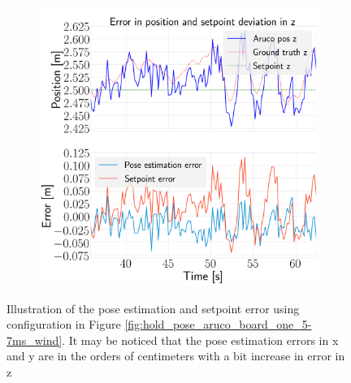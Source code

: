 \documentclass[../Head/report.tex]{subfiles}
\begin{document}
\begin{figure}[H]
\begin{subfigure}[t]{.30\textwidth}
        \caption{}
        \label{fig:hold_pose_estimation_test2_y}
    \end{subfigure}
     \hspace{0.2em}
    \begin{subfigure}[t]{.30\textwidth}
        \centering
        \includegraphics[width=\textwidth]{../Figures/hold_pose_using_aruco_pose_estimation/test2_gps2visionBoard_1.0Wind_-1.0y/error_z/pose_error_z_test1.png}
        \caption{}
        \label{fig:hold_pose_estimation_test2_z}
    \end{subfigure}
    \caption{Illustration of the pose estimation and setpoint error using configuration in Figure \ref{fig:hold_pose_aruco_board_one_5-7ms_wind}. It may be noticed that the pose estimation errors in x and y are in the orders of centimeters with a bit increase in error in z}
    \label{fig:hold_pose_estimation_test2_error_pos}
\end{figure}
\end{document}
